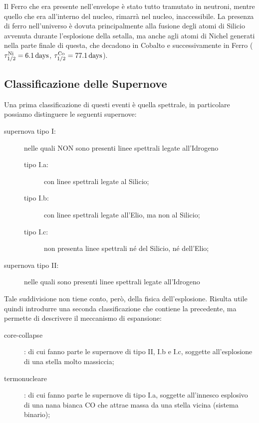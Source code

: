 Il Ferro che era presente nell'envelope è stato tutto tramutato in neutroni, mentre quello che era all'interno del nucleo, rimarrà nel nucleo, inaccessibile. La presenza di ferro nell'universo è dovuta principalmente alla fusione degli atomi di Silicio avvenuta durante l'esplosione della setalla, ma anche agli atomi di Nichel generati nella parte finale di questa, che decadono in Cobalto e successivamente in Ferro ($\tau_{1/2}^{\mbox{\scriptsize{Ni}}} = \SI{6.1}{days}$, $\tau_{1/2}^{\mbox{\scriptsize{Co}}} = \SI{77.1}{days}$).
\subsection{Classificazione delle Supernove} \label{sec:calss-supernove}

Una prima classificazione di questi eventi è quella spettrale, in particolare possiamo distinguere le seguenti supernove:
\begin{description}
    \item[supernova tipo I:] nelle quali NON sono presenti linee spettrali legate all'Idrogeno
    \begin{description}
        \item[tipo I.a:] con linee spettrali legate al Silicio;
        \item[tipo I.b:] con linee spettrali legate all'Elio, ma non al Silicio;
        \item[tipo I.c:] non presenta linee spettrali né del Silicio, né dell'Elio;
    \end{description}
    \item[supernova tipo II:] nelle quali sono presenti linee spettrali legate all'Idrogeno
\end{description}

Tale suddivisione non tiene conto, però, della fisica dell'esplosione. Risulta utile quindi introdurre una seconda classificazione che contiene la precedente, ma permette di descrivere il meccanismo di espansione:
\begin{description}
    \item[core-collapse]: di cui fanno parte le supernove di tipo II, I.b e I.c, soggette all'esplosione di una stella molto massiccia;
    \item[termonucleare]: di cui fanno parte le supernove di tipo I.a, soggette all'innesco esplosivo di una nana bianca CO che attrae massa da una stella vicina (sistema binario);
\end{description}

